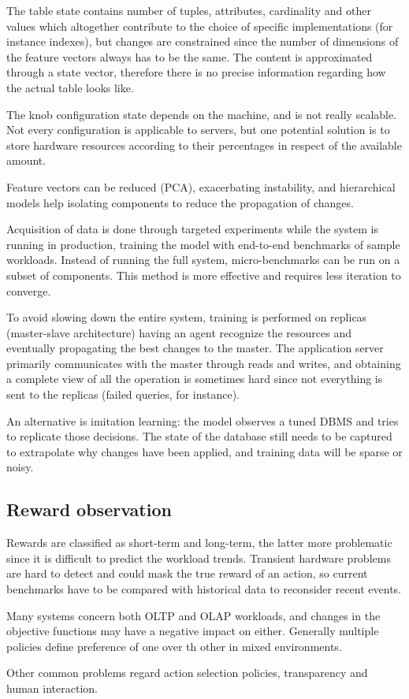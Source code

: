 The table state contains number of tuples, attributes, cardinality and other values which altogether contribute to the choice of specific implementations (for instance indexes), but changes are constrained since the number of dimensions of the feature vectors always has to be the same. The content is approximated through a state vector, therefore there is no precise information regarding how the actual table looks like. 

The knob configuration state depends on the machine, and is not really scalable. Not every configuration is applicable to servers, but one potential solution is to store hardware resources according to their percentages in respect of the available amount. 

Feature vectors can be reduced (PCA), exacerbating instability, and hierarchical models help isolating components to reduce the propagation of changes. 

Acquisition of data is done through targeted experiments while the system is running in production, training the model with end-to-end benchmarks of sample workloads. Instead of running the full system, micro-benchmarks can be run on a subset of components. This method is more effective and requires less iteration to converge. 

To avoid slowing down the entire system, training is performed on replicas (master-slave architecture) having an agent recognize the resources and eventually propagating the best changes to the master. The application server primarily communicates with the master through reads and writes, and obtaining a complete view of all the operation is sometimes hard since not everything is sent to the replicas (failed queries, for instance). 

An alternative is imitation learning: the model observes a tuned DBMS and tries to replicate those decisions. The state of the database still needs to be captured to extrapolate why changes have been applied, and training data will be sparse or noisy.

\subsection{Reward observation}
Rewards are classified as short-term and long-term, the latter more problematic since it is difficult to predict the workload trends. Transient hardware problems are hard to detect and could mask the true reward of an action, so current benchmarks have to be compared with historical data to reconsider recent events. 

Many systems concern both OLTP and OLAP workloads, and changes in the objective functions may have a negative impact on either. Generally multiple policies define preference of one over th other in mixed environments. 

Other common problems regard action selection policies, transparency and human interaction. 
